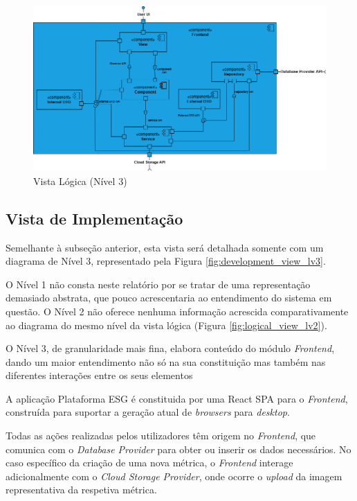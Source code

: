 \begin{landscape}
\begin{figure}[p]
    \centering
    \includegraphics[width=\linewidth,keepaspectratio]{frontmatter/assets/diagrams/Logical View/Logical View Lv3.drawio.png}
    \caption{Vista Lógica (Nível 3)}
    \label{fig:logical_view_lv3}
\end{figure}
\end{landscape}

\subsection{Vista de Implementação}

Semelhante à subseção anterior, esta vista será detalhada somente com um diagrama de Nível 3, representado pela Figura \ref{fig:development_view_lv3}.

O Nível 1 não consta neste relatório por se tratar de uma representação demasiado abstrata, que pouco acrescentaria ao entendimento do sistema em questão. O Nível 2 não oferece nenhuma informação acrescida comparativamente ao diagrama do mesmo nível da vista lógica (Figura \ref{fig:logical_view_lv2}).

O Nível 3, de granularidade mais fina, elabora conteúdo do módulo \textit{Frontend}, dando um maior  entendimento não só na sua constituição mas também nas diferentes interações entre os seus elementos 

A aplicação Plataforma ESG é constituida por uma React \gls{SPA} para o \textit{Frontend}, construída para suportar a geração atual de \textit{browsers} para \textit{desktop}.

Todas as ações realizadas pelos utilizadores têm origem no \textit{Frontend}, que comunica com o \textit{Database Provider} para obter ou inserir os dados necessários. No caso específico da criação de uma nova métrica, o \textit{Frontend} interage adicionalmente com o \textit{Cloud Storage Provider}, onde ocorre o \textit{upload} da imagem representativa da respetiva métrica.

